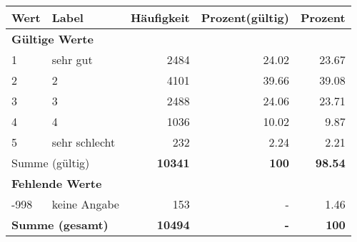      \begin{longtable}{lXrrr}
     \toprule
     \textbf{Wert} & \textbf{Label} & \textbf{Häufigkeit} & \textbf{Prozent(gültig)} & \textbf{Prozent} \\
     \endhead
     \midrule
     \multicolumn{5}{l}{\textbf{Gültige Werte}}\\

     1 &
     \multicolumn{1}{X}{ sehr gut   } &


       \num{2484} &
       \num[round-mode=places,round-precision=2]{24,02} &
         \num[round-mode=places,round-precision=2]{23,67} \\

     2 &
     \multicolumn{1}{X}{ 2   } &


       \num{4101} &
       \num[round-mode=places,round-precision=2]{39,66} &
         \num[round-mode=places,round-precision=2]{39,08} \\

     3 &
     \multicolumn{1}{X}{ 3   } &


       \num{2488} &
       \num[round-mode=places,round-precision=2]{24,06} &
         \num[round-mode=places,round-precision=2]{23,71} \\

     4 &
     \multicolumn{1}{X}{ 4   } &


       \num{1036} &
       \num[round-mode=places,round-precision=2]{10,02} &
         \num[round-mode=places,round-precision=2]{9,87} \\

     5 &
     \multicolumn{1}{X}{ sehr schlecht   } &


       \num{232} &
       \num[round-mode=places,round-precision=2]{2,24} &
         \num[round-mode=places,round-precision=2]{2,21} \\
     \midrule
     \multicolumn{2}{l}{Summe (gültig)} &
       \textbf{\num{10341}} &
     \textbf{100} &
       \textbf{\num[round-mode=places,round-precision=2]{98,54}} \\
     \multicolumn{5}{l}{\textbf{Fehlende Werte}}\\
       -998 &
       keine Angabe &
         \num{153} &
        - &
         \num[round-mode=places,round-precision=2]{1,46} \\
     \midrule
     \multicolumn{2}{l}{\textbf{Summe (gesamt)}} &
          \textbf{\num{10494}} &
        \textbf{-} &
        \textbf{100} \\
     \bottomrule
     \end{longtable}
     
